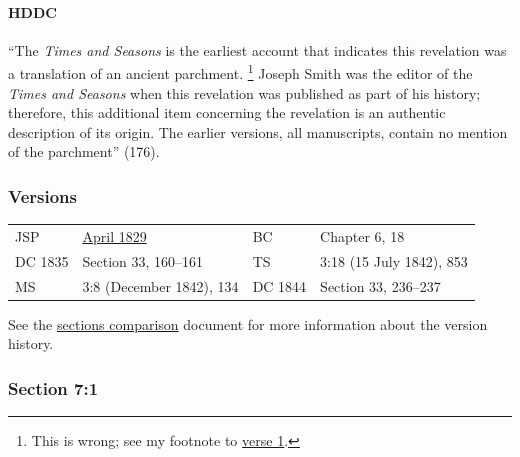 		\paragraph{HDDC}
		
			``The \textit{Times and Seasons} is the earliest account that indicates this revelation was a translation of an ancient parchment.%
				\footnote{%
					This is wrong; see my footnote to \hyperref[DC7-1]{verse 1}.
					}
			Joseph Smith was the editor of the \textit{Times and Seasons} when this revelation was published as part of his history; therefore, this additional item concerning the revelation is an authentic description of its origin. The earlier versions, all manuscripts, contain no mention of the parchment'' (176).
		
	\subsubsection{Versions}
		\label{DC8-V}
	
		\begin{tabular}{p{1in}p{2in}p{1in}p{2in}}
			JSP		& \hyperref[EMS-1828-1829-JS-APR-1829-C]{April 1829}		& BC	& Chapter 6, 18 \\
			DC 1835	& Section 33, 160--161										& TS	& 3:18 (15 July 1842), 853 \\
			MS		& 3:8 (December 1842), 134									& DC 1844 & Section 33, 236--237 \\
		\end{tabular}
		
		\medskip
		
		See the \href{https://drive.google.com/file/d/1goAvNz8jS4R8slYfMG_db55Ty2z_vmgK/view?usp=sharing}{sections comparison} document for more information about the version history.

	\subsubsection{Section 7:1} %
		\label{DC7-1}

